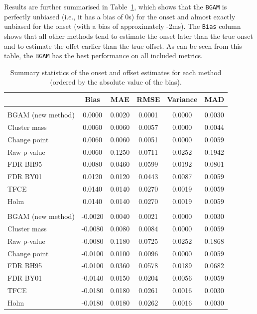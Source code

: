 \documentclass[
  doc,
  floatsintext,
  longtable,
  a4paper,
  nolmodern,
  notxfonts,
  notimes,
  donotrepeattitle,
  colorlinks=true,linkcolor=blue,citecolor=blue,urlcolor=blue]{apa7}
\begin{document}
Results are further summarised in Table~\ref{tbl-simulation-results},
which shows that the \texttt{BGAM} is perfectly unbiased (i.e., it has a
bias of 0s) for the onset and almost exactly unbiased for the onset
(with a bias of approximately -2ms). The \texttt{Bias} column shows that
all other methods tend to estimate the onset later than the true onset
and to estimate the offet earlier than the true offset. As can be seen
from this table, the \texttt{BGAM} has the best performance on all
included metrics.

\begin{table}

{\caption{{Summary statistics of the onset and offset estimates for each
method (ordered by the absolute value of the
bias).}{\label{tbl-simulation-results}}}}

\fontsize{9.0pt}{10.8pt}\selectfont
\begin{tabular*}{\linewidth}{@{\extracolsep{\fill}}lccccc}
\toprule
 & Bias & MAE & RMSE & Variance & MAD \\ 
\midrule\addlinespace[2.5pt]
\multicolumn{6}{l}{onset} \\[2.5pt] 
\midrule\addlinespace[2.5pt]
BGAM (new method) & 0.0000 & 0.0020 & 0.0001 & 0.0000 & 0.0030 \\ 
Cluster mass & 0.0060 & 0.0060 & 0.0057 & 0.0000 & 0.0044 \\ 
Change point & 0.0060 & 0.0060 & 0.0051 & 0.0000 & 0.0059 \\ 
Raw p-value & 0.0060 & 0.1250 & 0.0711 & 0.0252 & 0.1942 \\ 
FDR BH95 & 0.0080 & 0.0460 & 0.0599 & 0.0192 & 0.0801 \\ 
FDR BY01 & 0.0120 & 0.0120 & 0.0443 & 0.0087 & 0.0059 \\ 
TFCE & 0.0140 & 0.0140 & 0.0270 & 0.0019 & 0.0059 \\ 
Holm & 0.0140 & 0.0140 & 0.0270 & 0.0019 & 0.0059 \\ 
\midrule\addlinespace[2.5pt]
\multicolumn{6}{l}{offset} \\[2.5pt] 
\midrule\addlinespace[2.5pt]
BGAM (new method) & -0.0020 & 0.0040 & 0.0021 & 0.0000 & 0.0030 \\ 
Cluster mass & -0.0080 & 0.0080 & 0.0084 & 0.0000 & 0.0059 \\ 
Raw p-value & -0.0080 & 0.1180 & 0.0725 & 0.0252 & 0.1868 \\ 
Change point & -0.0100 & 0.0100 & 0.0096 & 0.0000 & 0.0059 \\ 
FDR BH95 & -0.0100 & 0.0360 & 0.0578 & 0.0189 & 0.0682 \\ 
FDR BY01 & -0.0140 & 0.0150 & 0.0204 & 0.0056 & 0.0059 \\ 
TFCE & -0.0180 & 0.0180 & 0.0261 & 0.0016 & 0.0030 \\ 
Holm & -0.0180 & 0.0180 & 0.0262 & 0.0016 & 0.0030 \\ 
\bottomrule
\end{tabular*}

\end{table}
\end{document}
